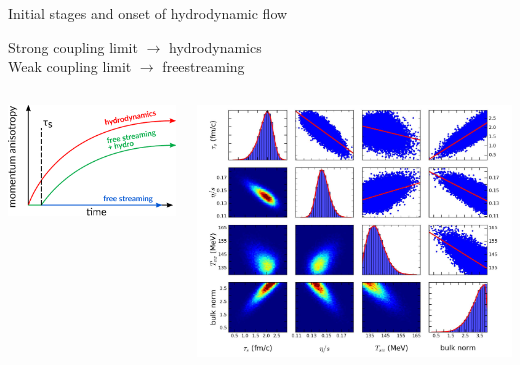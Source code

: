 \documentclass{beamer}
\begin{document}
\begin{frame}{Initial stages and onset of hydrodynamic flow}
  \begin{center}
    Strong coupling limit $\rightarrow$ hydrodynamics\\
    Weak coupling limit $\rightarrow$ freestreaming
  \end{center}
  \begin{columns}
    \begin{column}{.55\textwidth}
      \includegraphics[width=\columnwidth]{freestreaming_sketch}
    \end{column}
    \begin{column}{.45\textwidth}
      \includegraphics[width=\columnwidth]{heinz-liu}
    \end{column}

\end{columns}
\end{frame}
\end{document}
